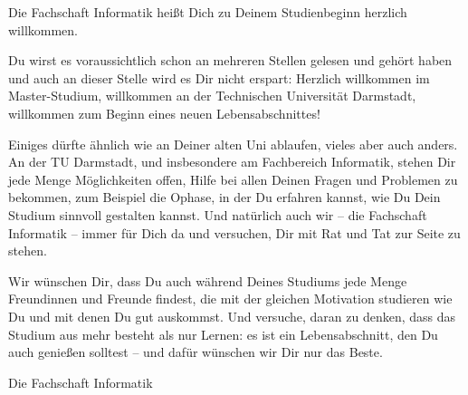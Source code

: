 {Die Fachschaft Informatik heißt Dich zu Deinem Studienbeginn herzlich willkommen.}{
    Du wirst es voraussichtlich schon an mehreren Stellen gelesen und gehört haben und auch an dieser Stelle wird es Dir nicht erspart: Herzlich willkommen im Master-Studium, willkommen an der Technischen Universität Darmstadt, willkommen zum Beginn eines neuen Lebensabschnittes!

    Einiges dürfte ähnlich wie an Deiner alten Uni ablaufen, vieles aber auch anders. An der TU Darmstadt, und insbesondere am Fachbereich Informatik, stehen Dir jede Menge Möglichkeiten offen, Hilfe bei allen Deinen Fragen und Problemen zu bekommen, zum Beispiel die Ophase, in der Du erfahren kannst, wie Du Dein Studium sinnvoll gestalten kannst. Und natürlich auch wir – die Fachschaft Informatik – immer für Dich da und versuchen, Dir mit Rat und Tat zur Seite zu stehen.

    Wir wünschen Dir, dass Du auch während Deines Studiums jede Menge Freundinnen und Freunde findest, die mit der gleichen Motivation studieren wie Du und mit denen Du gut auskommst. Und versuche, daran zu denken, dass das Studium aus mehr besteht als nur Lernen: es ist ein Lebensabschnitt, den Du auch genießen solltest – und dafür wünschen wir Dir nur das Beste.
}
{Die Fachschaft Informatik}

\vfill

\noindent
{}

\newpage
